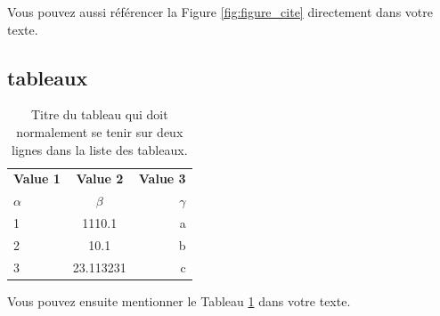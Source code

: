  Vous pouvez aussi référencer la Figure \ref{fig:figure_cite} directement dans votre texte.

\subsection{tableaux}

\begin{table}[H]
  \begin{center}
    \caption{Titre du tableau qui doit normalement se tenir sur deux lignes dans la liste des tableaux.}
    \label{tab:tab_1}
    \begin{tabular}{l|c|r}
      \textbf{Value 1} & \textbf{Value 2} & \textbf{Value 3}\\
      $\alpha$ & $\beta$ & $\gamma$ \\
      \hline
      1 & 1110.1 & a\\
      2 & 10.1 & b\\
      3 & 23.113231 & c\\
    \end{tabular}
  \end{center}
\end{table}

Vous pouvez ensuite mentionner le Tableau \ref{tab:tab_1} dans votre texte.
